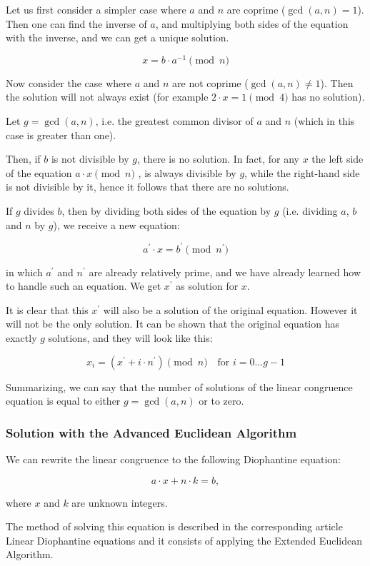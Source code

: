 \documentclass[8pt, a4paper, oneside, twocolumn]{extarticle}
\begin{document}
Let us first consider a simpler case where $a$ and $n$ are coprime ($\gcd(a, n) = 1$). Then one can find the inverse of $a$, and multiplying both sides of the equation with the inverse, and we can get a unique solution.

$$x = b \cdot a ^ {- 1} \pmod n$$

Now consider the case where $a$ and $n$ are not coprime ($\gcd(a, n) \ne 1$). Then the solution will not always exist (for example $2 \cdot x = 1 \pmod 4$ has no solution).

Let $g = \gcd(a, n)$, i.e. the greatest common divisor of $a$ and $n$ (which in this case is greater than one).

Then, if $b$ is not divisible by $g$, there is no solution. In fact, for any $x$ the left side of the equation $a \cdot x \pmod n$ , is always divisible by $g$, while the right-hand side is not divisible by it, hence it follows that there are no solutions.

If $g$ divides $b$, then by dividing both sides of the equation by $g$ (i.e. dividing $a$, $b$ and $n$ by $g$), we receive a new equation:

$$a^\prime \cdot x = b^\prime \pmod{n^\prime}$$

in which $a^\prime$ and $n^\prime$ are already relatively prime, and we have already learned how to handle such an equation. We get $x^\prime$ as solution for $x$.

It is clear that this $x^\prime$ will also be a solution of the original equation. However it will not be the only solution. It can be shown that the original equation has exactly $g$ solutions, and they will look like this:

$$x_i = (x^\prime + i\cdot n^\prime) \pmod n \quad \text{for } i = 0 \ldots g-1$$

Summarizing, we can say that the number of solutions of the linear congruence equation is equal to either $g = \gcd(a, n)$ or to zero.
\subsubsection{Solution with the Advanced Euclidean Algorithm}

We can rewrite the linear congruence to the following Diophantine equation:

$$a \cdot x + n \cdot k = b,$$

where $x$ and $k$ are unknown integers.

The method of solving this equation is described in the corresponding article Linear Diophantine equations and it consists of applying the Extended Euclidean Algorithm.
\end{document}
